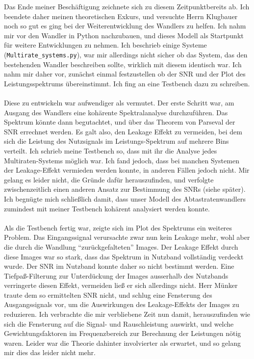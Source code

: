 \documentclass[11pt]{article}
\newcommand{\code}[1] {\texttt{#1}}
\begin{document}
Das Ende meiner Beschäftigung zeichnete sich zu diesem Zeitpunktbereits ab. Ich beendete daher meinen theoretischen
Exkurs, und versuchte Herrn Klugbauer noch so gut es ging bei der Weiterentwicklung des Wandlers zu helfen. Ich nahm mir vor den Wandler in Python nachzubauen, und dieses Modell als Startpunkt für weitere Entwicklungen zu nehmen. 
Ich beschrieb einige Systeme (\code{Multirate\_systems.py}), war mir allerdings nicht sicher ob das System, das den bestehenden Wandler beschreiben sollte, wirklich mit diesem identisch war. Ich nahm mir daher vor, zunächst einmal festzustellen ob der SNR und der Plot des Leistungsspektrums übereinstimmt. Ich fing an eine Testbench dazu zu schreiben. \\
\\
Diese zu entwickeln war aufwendiger als vermutet. Der erste Schritt war, am Ausgang des Wandlers eine kohärente Spektralanalyse durchzuführen. Das Spektrum könnte dann begutachtet, und über das Theorem von Parseval der SNR errechnet werden. Es galt also, den Leakage Effekt zu vermeiden, bei dem sich die Leistung des Nutzsignals im Leistungs-Spektrum auf mehrere Bins verteilt. Ich schrieb meine Testbench so, dass mit ihr die Analyse jedes Multiraten-Systems möglich war. Ich fand jedoch, dass bei manchen Systemen der Leakage-Effekt vermieden werden konnte, in anderen Fällen jedoch nicht. Mir gelang es leider nicht, die Gründe dafür herauszufinden, und verfolgte zwischenzeitlich einen anderen Ansatz zur Bestimmung des SNRs (siehe später). Ich begnügte mich schließlich damit, dass unser Modell des Abtastratenwandlers zumindest mit meiner Testbench kohärent analysiert werden konnte.\\
\\
Als die Testbench fertig war, zeigte sich im Plot des Spektrums ein weiteres Problem. Das Eingangssignal verursachte zwar nun kein Leakage mehr, wohl aber die durch die Wandlung "`zurückgefalteten"' Images. Der Leakage Effekt durch diese Images war so stark, dass das Spektrum in Nutzband vollständig verdeckt wurde. Der SNR im Nutzband konnte daher so nicht bestimmt werden. Eine Tiefpaß-Filterung zur Unterdückung der Images ausserhalb des Nutzbands verringerte diesen Effekt, vermeiden ließ er sich allerdings nicht. Herr Münker traute dem so ermittelten SNR nicht, und schlug eine Fensterung des Ausgangssignals vor, um die Auswirkungen des Leakage-Effekts der Images zu reduzieren. Ich verbrachte die mir verbliebene Zeit nun damit, herauszufinden wie sich die Fensterung auf die Signal- und Rauschleistung auswirkt, und welche Gewichtungsfaktoren im Frequenzbereich zur Berechnung der Leistungen nötig waren. Leider war die Theorie dahinter involvierter als erwartet, und so gelang mir dies das leider nicht mehr.\\   
\end{document}
